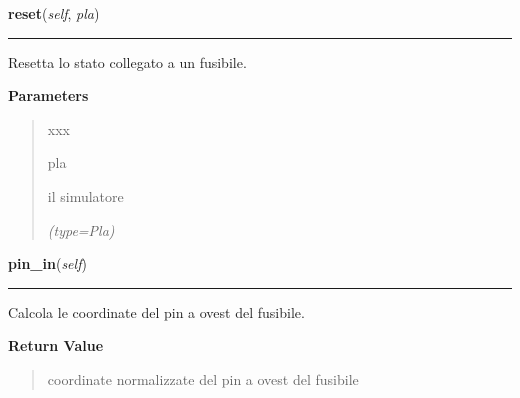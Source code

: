     \label{component:Fuse:reset}

    \vspace{0.5ex}

\hspace{.8\funcindent}\begin{boxedminipage}{\funcwidth}

    \raggedright \textbf{reset}(\textit{self}, \textit{pla})

    \vspace{-1.5ex}

    \rule{\textwidth}{0.5\fboxrule}
\setlength{\parskip}{2ex}
    Resetta lo stato collegato a un fusibile.

\setlength{\parskip}{1ex}
      \textbf{Parameters}
      \vspace{-1ex}

      \begin{quote}
        \begin{Ventry}{xxx}

          \item[pla]

          il simulatore

            {\it (type=Pla)}

        \end{Ventry}

      \end{quote}

    \end{boxedminipage}

    \label{component:Fuse:pin_in}

    \vspace{0.5ex}

\hspace{.8\funcindent}\begin{boxedminipage}{\funcwidth}

    \raggedright \textbf{pin\_in}(\textit{self})

    \vspace{-1.5ex}

    \rule{\textwidth}{0.5\fboxrule}
\setlength{\parskip}{2ex}
    Calcola le coordinate del pin a ovest del fusibile.

\setlength{\parskip}{1ex}
      \textbf{Return Value}
    \vspace{-1ex}

      \begin{quote}
      coordinate normalizzate del pin a ovest del fusibile

      \end{quote}

    \end{boxedminipage}

